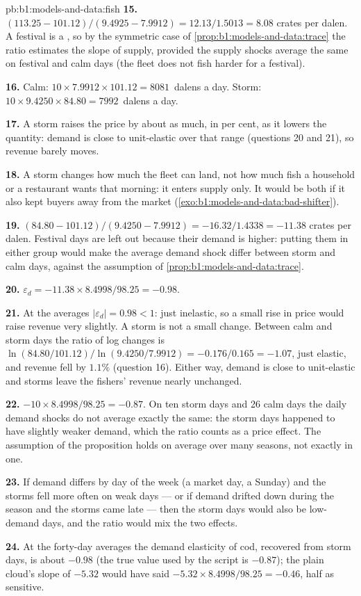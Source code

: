 \begin{solution}{pb:b1:models-and-data:fish}
\textbf{15.} $(113.25 - 101.12)/(9.4925 - 7.9912) = 12.13/1.5013 = 8.08$
crates per dalen. A festival is a , so by the symmetric case
of \cref{prop:b1:models-and-data:trace} the ratio estimates the slope of
supply, provided the supply shocks average the same on festival and calm
days (the fleet does not fish harder for a festival).

\textbf{16.} Calm: $10 \times 7.9912 \times 101.12 = \num{8081}$~dalens a day.
Storm: $10 \times 9.4250 \times 84.80 = \num{7992}$~dalens a day.

\textbf{17.} A storm raises the price by about as much, in per cent, as it
lowers the quantity: demand is close to unit-elastic over that range
(questions 20 and 21), so revenue barely moves.

\textbf{18.} A storm changes how much the fleet can land, not how much fish
a household or a restaurant wants that morning: it enters supply only. It
would be both if it also kept buyers away from the market
(\cref{exo:b1:models-and-data:bad-shifter}).

\textbf{19.} $(84.80 - 101.12)/(9.4250 - 7.9912) = -16.32/1.4338 = -11.38$
crates per dalen. Festival days are left out because their demand is
higher: putting them in either group would make the average demand shock
differ between storm and calm days, against the assumption of
\cref{prop:b1:models-and-data:trace}.

\textbf{20.} $\varepsilon_d = -11.38 \times 8.4998/98.25 = -0.98$.

\textbf{21.} At the averages $|\varepsilon_d| = 0.98 < 1$: just inelastic, so a
small rise in price would raise revenue very slightly. A storm is not a
small change. Between calm and storm days the ratio of log changes is
$\ln(84.80/101.12)/\ln(9.4250/7.9912) = -0.176/0.165 = -1.07$, just elastic,
and revenue fell by $1.1\%$ (question 16). Either way, demand is close to
unit-elastic and storms leave the fishers' revenue nearly unchanged.

\textbf{22.} $-10 \times 8.4998/98.25 = -0.87$. On ten storm days and 26 calm
days the daily demand shocks do not average exactly the same: the storm
days happened to have slightly weaker demand, which the ratio counts as a
price effect. The assumption of the proposition holds on average over many
seasons, not exactly in one.

\textbf{23.} If demand differs by day of the week (a market day, a Sunday)
and the storms fell more often on weak days --- or if demand drifted down
during the season and the storms came late --- then the storm days would
also be low-demand days, and the ratio would mix the two effects.

\textbf{24.} At the forty-day averages the demand elasticity of cod,
recovered from storm days, is about $-0.98$ (the true value used by the
script is $-0.87$); the plain cloud's slope of $-5.32$ would have said
$-5.32 \times 8.4998/98.25 = -0.46$, half as sensitive.
\end{solution}
